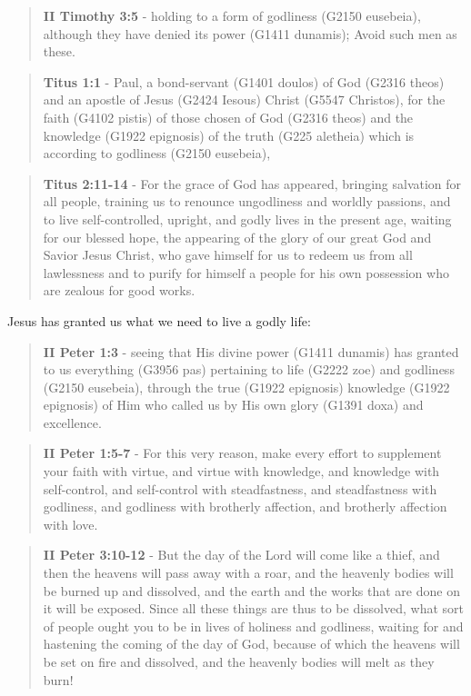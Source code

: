 \documentclass[11pt]{article}
\begin{document}
\begin{quote}
\textbf{II Timothy 3:5} - holding to a form of godliness (G2150 eusebeia), although they have denied its power (G1411 dunamis); Avoid such men as these.
\end{quote}

\begin{quote}
\textbf{Titus 1:1} - Paul, a bond-servant (G1401 doulos) of God (G2316 theos) and an apostle of Jesus (G2424 Iesous) Christ (G5547 Christos), for the faith (G4102 pistis) of those chosen of God (G2316 theos) and the knowledge (G1922 epignosis) of the truth (G225 aletheia) which is according to godliness (G2150 eusebeia),
\end{quote}

\begin{quote}
\textbf{Titus 2:11-14} - For the grace of God has appeared, bringing salvation for all people, training us to renounce ungodliness and worldly passions, and to live self-controlled, upright, and godly lives in the present age, waiting for our blessed hope, the appearing of the glory of our great God and Savior Jesus Christ, who gave himself for us to redeem us from all lawlessness and to purify for himself a people for his own possession who are zealous for good works.
\end{quote}

Jesus has granted us what we need to live a godly life:

\begin{quote}
\textbf{II Peter 1:3} - seeing that His divine power (G1411 dunamis) has granted to us everything (G3956 pas) pertaining to life (G2222 zoe) and godliness (G2150 eusebeia), through the true (G1922 epignosis) knowledge (G1922 epignosis) of Him who called us by His own glory (G1391 doxa) and excellence.
\end{quote}

\begin{quote}
\textbf{II Peter 1:5-7} - For this very reason, make every effort to supplement your faith with virtue, and virtue with knowledge, and knowledge with self-control, and self-control with steadfastness, and steadfastness with godliness, and godliness with brotherly affection, and brotherly affection with love.
\end{quote}

\begin{quote}
\textbf{II Peter 3:10-12} - But the day of the Lord will come like a thief, and then the heavens will pass away with a roar, and the heavenly bodies will be burned up and dissolved, and the earth and the works that are done on it will be exposed. Since all these things are thus to be dissolved, what sort of people ought you to be in lives of holiness and godliness, waiting for and hastening the coming of the day of God, because of which the heavens will be set on fire and dissolved, and the heavenly bodies will melt as they burn!
\end{quote}
\end{document}
